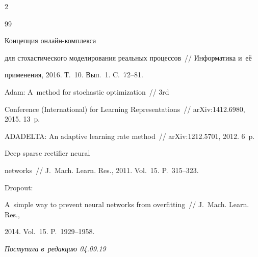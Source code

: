 \begin{multicols}{2}
{{\begin{thebibliography}{99}

 Концепция он\-лайн-ком\-плек\-са 

для стохастического моделирования реальных процессов~// Информатика и~её 

применения, 2016. Т.~10. Вып.~1. C.~72--81. 





Adam: A~method for stochastic optimization~// 3rd 

 Conference (International) for Learning Representations~// arXiv:1412.6980, 2015. 13~p.





ADADELTA: An adaptive learning rate method~// arXiv:1212.5701, 2012. 6~p.





Deep sparse rectifier neural

networks~// J.~Mach. Learn. Res., 2011. Vol.~15. P.~315--323.




 Dropout: 

A~simple way to prevent neural networks from overfitting~// J.~Mach. Learn. Res., 

2014. Vol.~15. P.~1929--1958.

 \end{thebibliography}



 }

 }



\end{multicols}



\vspace*{-6pt}



\hfill{\small\textit{Поступила в~редакцию 04.09.19}}






